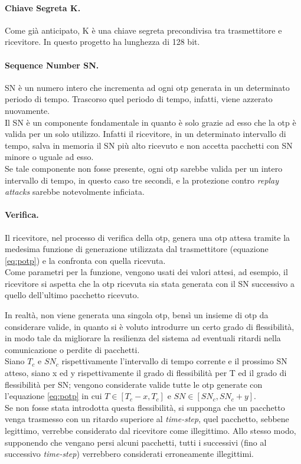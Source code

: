 \paragraph{Chiave Segreta K.}
Come già anticipato, K è una chiave segreta precondivisa tra trasmettitore e ricevitore. In questo progetto ha lunghezza di 128 bit.

\paragraph{Sequence Number SN.}
SN è un numero intero che incrementa ad ogni \gls{otp} generata in un determinato periodo di tempo. Trascorso quel periodo di tempo, infatti, viene azzerato nuovamente.\\
Il SN è un componente fondamentale in quanto è solo grazie ad esso che la \gls{otp} è valida per un solo utilizzo. Infatti il ricevitore, in un determinato intervallo di tempo, salva in memoria il SN più alto ricevuto e non accetta pacchetti con SN minore o uguale ad esso.\\
Se tale componente non fosse presente, ogni \gls{otp} sarebbe valida per un intero intervallo di tempo, in questo caso tre secondi, e la protezione contro \textit{replay attacks} sarebbe notevolmente inficiata.

\paragraph{Verifica.}
Il ricevitore, nel processo di verifica della \gls{otp}, genera una \gls{otp} attesa tramite la medesima funzione di generazione utilizzata dal trasmettitore (equazione \ref{eq:potp}) e la confronta con quella ricevuta.\\
Come parametri per la funzione, vengono usati dei valori attesi, ad esempio, il ricevitore si aspetta che la \gls{otp} ricevuta sia stata generata con il SN successivo a quello dell'ultimo pacchetto ricevuto.

In realtà, non viene generata una singola \gls{otp}, bensì un insieme di \gls{otp} da considerare valide, in quanto si è voluto introdurre un certo grado di flessibilità, in modo tale da migliorare la resilienza del sistema ad eventuali ritardi nella comunicazione o perdite di pacchetti.\\
Siano $T_c$ e $SN_c$ rispettivamente l'intervallo di tempo corrente e il prossimo SN atteso, siano x ed y rispettivamente il grado di flessibilità per T ed il grado di flessibilità per SN; vengono considerate valide tutte le \gls{otp} generate con l'equazione \ref{eq:potp} in cui $T \in [T_c - x, T_c]$ e $SN \in [SN_c, SN_c + y]$.\\
Se non fosse stata introdotta questa flessibilità, si supponga che un pacchetto venga trasmesso con un ritardo superiore al \textit{time-step}, quel pacchetto, sebbene legittimo, verrebbe considerato dal ricevitore come illegittimo. Allo stesso modo, supponendo che vengano persi alcuni pacchetti, tutti i successivi (fino al successivo \textit{time-step}) verrebbero considerati erroneamente illegittimi.


